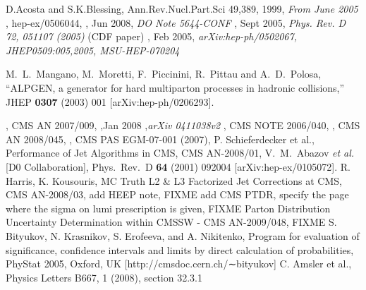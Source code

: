 


%

\begin{thebibliography}{9}
   {D.Acosta and S.K.Blessing, Ann.Rev.Nucl.Part.Sci 49,389},
    1999,
    {\em From June 2005}
  , hep-ex/0506044,
  , Jun 2008,
  {\em DO Note 5644-CONF}
  , Sept 2005,
  {\em Phys. Rev. D 72, 051107 (2005)} (CDF paper)
  , Feb 2005,
  {\em arXiv:hep-ph/0502067, JHEP0509:005,2005, MSU-HEP-070204}
  

    M.~L.~Mangano, M.~Moretti, F.~Piccinini, R.~Pittau and A.~D.~Polosa,
    ``ALPGEN, a generator for hard multiparton processes in hadronic collisions,''
    JHEP {\bf 0307} (2003) 001
    [arXiv:hep-ph/0206293].

  , CMS AN 2007/009,
  ,Jan 2008 ,{\em arXiv 0411038v2}
  , CMS NOTE 2006/040,
  , CMS AN 2008/045,
  , CMS PAS EGM-07-001 (2007),
   {P. Schieferdecker et al., Performance of Jet Algorithms in CMS}, CMS AN-2008/01,
    V.~M.~Abazov {\it et al.}  [D0 Collaboration], 	 
    Phys.\ Rev.\  D {\bf 64} (2001) 092004 	 
    [arXiv:hep-ex/0105072]. 	 
   {R. Harris, K. Kousouris, MC Truth L2 \& L3 Factorized Jet Corrections at CMS}, CMS AN-2008/03,
   {add HEEP note}, FIXME
   {add CMS PTDR, specify the page where the sigma on lumi prescription is given}, FIXME
   {Parton Distribution Uncertainty Determination within CMSSW - CMS AN-2009/048}, FIXME
   S. Bityukov, N. Krasnikov, S. Erofeeva, and A. Nikitenko, Program for evaluation of significance,
                    confidence intervals and limits by direct calculation of probabilities, PhyStat 2005, Oxford, UK 
                    [http://cmsdoc.cern.ch/∼bityukov]
    C. Amsler et al., Physics Letters B667, 1 (2008), section 32.3.1

 
 
 \end{thebibliography}
 

%
